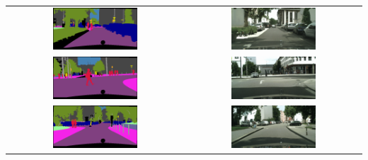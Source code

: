\begin{longtable}{cc}
    \includegraphics[width=0.50\textwidth]{Chapters/figures/appendix/cityscapes/frankfurt_000001_023769_leftImg8bit_mask.png} &
    \includegraphics[width=0.50\textwidth]{Chapters/figures/appendix/cityscapes/frankfurt_000001_023769_leftImg8bit_sample.png} \\
    \includegraphics[width=0.50\textwidth]{Chapters/figures/appendix/cityscapes/frankfurt_000001_034047_leftImg8bit_mask.png} & \includegraphics[width=0.50\textwidth]{Chapters/figures/appendix/cityscapes/frankfurt_000001_034047_leftImg8bit_sample.png} \\
    \includegraphics[width=0.50\textwidth]{Chapters/figures/appendix/cityscapes/frankfurt_000001_046272_leftImg8bit_mask.png} &\includegraphics[width=0.50\textwidth]{Chapters/figures/appendix/cityscapes/frankfurt_000001_046272_leftImg8bit_sample.png} \\

\end{longtable}
